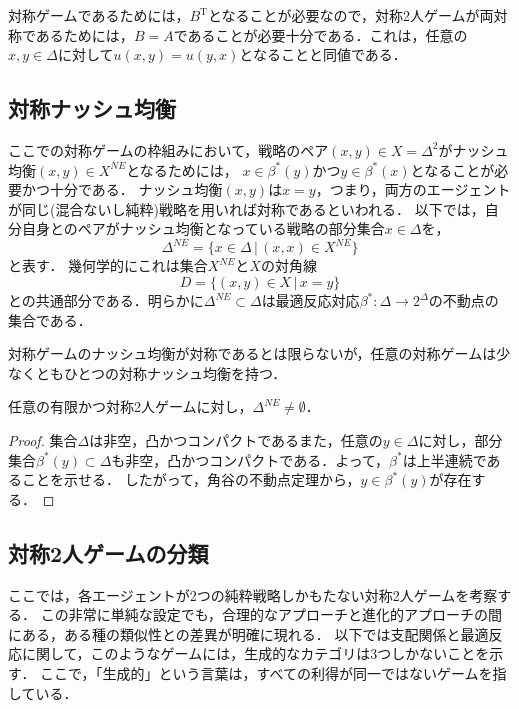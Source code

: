 \documentclass{jsreport}
\begin{document}
対称ゲームであるためには，$B^{\mathrm{T}}$となることが必要なので，対称2人ゲームが両対称であるためには，$B = A$であることが必要十分である．これは，任意の$x, y \in \Delta$に対して$u(x, y) = u(y, x)$となることと同値である．

\subsection{対称ナッシュ均衡}
ここでの対称ゲームの枠組みにおいて，戦略のペア$(x, y) \in X = \Delta^2$がナッシュ均衡$(x, y) \in X^{NE}$となるためには，
$x \in \beta^{*}(y)$かつ$y \in \beta^{*}(x)$となることが必要かつ十分である．
ナッシュ均衡$(x, y)$は$x = y$，つまり，両方のエージェントが同じ(混合ないし純粋)戦略を用いれば対称であるといわれる．
以下では，自分自身とのペアがナッシュ均衡となっている戦略の部分集合$x \in \Delta$を，
\begin{equation}
  \Delta^{NE} = \{x \in \Delta \, | \, (x, x) \in X^{NE}\} \label{eq:nash_self}
\end{equation}
と表す．
幾何学的にこれは集合$X^{NE}$と$X$の対角線
\begin{equation}
  D = \{(x, y) \in X \, | \, x = y\} \nonumber
\end{equation}
との共通部分である．明らかに$\Delta^{NE} \subset \Delta$は最適反応対応$\beta^{*}: \Delta \to 2^{\Delta}$の不動点の集合である．

対称ゲームのナッシュ均衡が対称であるとは限らないが，任意の対称ゲームは少なくともひとつの対称ナッシュ均衡を持つ．

\begin{screen}
  \begin{prop}
    任意の有限かつ対称2人ゲームに対し，$\Delta^{NE} \neq \emptyset$．
  \end{prop}
\end{screen}
\begin{proof}
  集合$\Delta$は非空，凸かつコンパクトであるまた，任意の$y \in \Delta$に対し，部分集合$\beta^{*}(y) \subset \Delta$も非空，凸かつコンパクトである．よって，$\beta^{*}$は上半連続であることを示せる．
  したがって，角谷の不動点定理から，$y \in \beta^{*}(y)$が存在する．
\end{proof}

\subsection{対称2人ゲームの分類}
ここでは，各エージェントが2つの純粋戦略しかもたない対称2人ゲームを考察する．
この非常に単純な設定でも，合理的なアプローチと進化的アプローチの間にある，ある種の類似性との差異が明確に現れる．
以下では支配関係と最適反応に関して，このようなゲームには，生成的なカテゴリは3つしかないことを示す．
ここで，「生成的」という言葉は，すべての利得が同一ではないゲームを指している．
\end{document}
